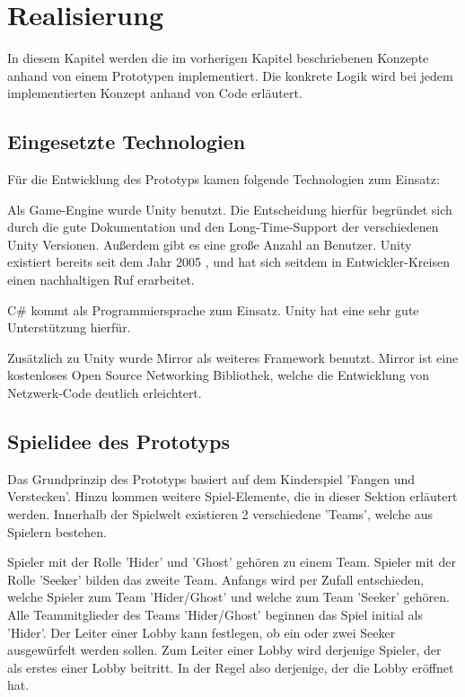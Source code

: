 \chapter{Realisierung}
\label{sec:realisierung}

In diesem Kapitel werden die im vorherigen Kapitel beschriebenen Konzepte anhand von einem Prototypen implementiert. Die konkrete Logik wird bei jedem implementierten Konzept anhand von Code erläutert.

\section{Eingesetzte Technologien}

Für die Entwicklung des Prototyps kamen folgende Technologien zum Einsatz:

Als Game-Engine wurde Unity \cite{Technologies.03.02.2022} benutzt. Die Entscheidung hierfür begründet sich durch die gute Dokumentation und den Long-Time-Support der verschiedenen Unity Versionen. Außerdem gibt es eine große Anzahl an Benutzer. Unity existiert bereits seit dem Jahr 2005 \cite{Wikipedia.2022c}, und hat sich seitdem in Entwickler-Kreisen einen nachhaltigen Ruf erarbeitet.

C\# kommt als Programmiersprache zum Einsatz. Unity hat eine sehr gute Unterstützung hierfür.

Zusätzlich zu Unity wurde Mirror\cite{.03.02.2022} als weiteres Framework benutzt. Mirror ist eine kostenloses Open Source Networking Bibliothek, welche die Entwicklung von Netzwerk-Code deutlich erleichtert.

\section{Spielidee des Prototyps}
\label{Spielidee}

Das Grundprinzip des Prototyps basiert auf dem Kinderspiel 'Fangen und Verstecken'. Hinzu kommen weitere Spiel-Elemente, die in dieser Sektion erläutert werden. Innerhalb der Spielwelt existieren 2 verschiedene 'Teams', welche aus Spielern bestehen.

Spieler mit der Rolle 'Hider' und 'Ghost' gehören zu einem Team.  Spieler mit der Rolle 'Seeker' bilden das zweite Team. Anfangs wird per Zufall entschieden, welche Spieler zum Team 'Hider/Ghost' und welche zum Team 'Seeker' gehören. Alle Teammitglieder des Teams 'Hider/Ghost' beginnen das Spiel initial als 'Hider'. Der Leiter einer Lobby kann festlegen, ob ein oder zwei Seeker ausgewürfelt werden sollen. Zum Leiter einer Lobby wird derjenige Spieler, der als erstes einer Lobby beitritt. In der Regel also derjenige, der die Lobby eröffnet hat. 

